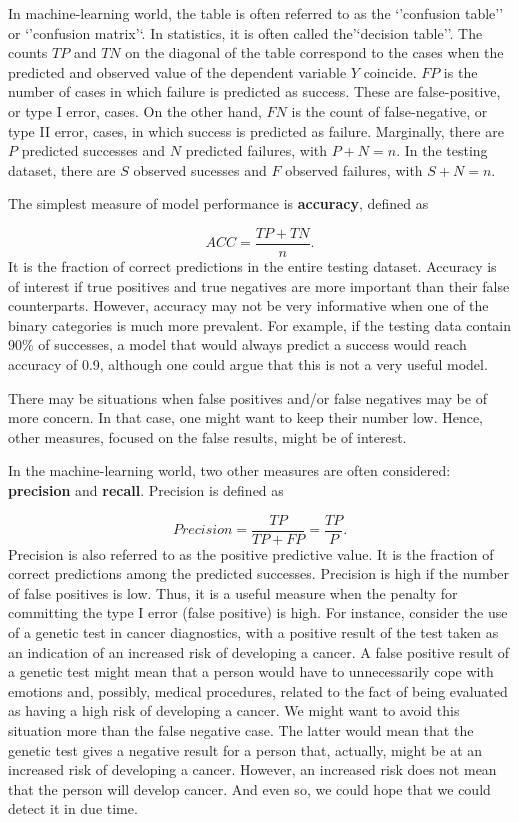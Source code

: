 \documentclass[12pt,]{krantz}
\begin{document}
In machine-learning world, the table is often referred to as the `'confusion table'' or `'confusion matrix'`. In statistics, it is often called the'`decision table''. The counts \(TP\) and \(TN\) on the diagonal of the table correspond to the cases when the predicted and observed value of the dependent variable \(Y\) coincide. \(FP\) is the number of cases in which failure is predicted as success. These are false-positive, or type I error, cases. On the other hand, \(FN\) is the count of false-negative, or type II error, cases, in which success is predicted as failure. Marginally, there are \(P\) predicted successes and \(N\) predicted failures, with \(P+N=n\). In the testing dataset, there are \(S\) observed sucesses and \(F\) observed failures, with \(S+N=n\).

The simplest measure of model performance is \textbf{accuracy}, defined as

\[
ACC = \frac{TP+TN}{n}.
\]
It is the fraction of correct predictions in the entire testing dataset. Accuracy is of interest if true positives and true negatives are more important than their false counterparts. However, accuracy may not be very informative when one of the binary categories is much more prevalent. For example, if the testing data contain 90\% of successes, a model that would always predict a success would reach accuracy of 0.9, although one could argue that this is not a very useful model.

There may be situations when false positives and/or false negatives may be of more concern. In that case, one might want to keep their number low. Hence, other measures, focused on the false results, might be of interest.

In the machine-learning world, two other measures are often considered: \textbf{precision} and \textbf{recall}. Precision is defined as

\[
Precision = \frac{TP}{TP+FP} = \frac{TP}{P}.
\]
Precision is also referred to as the positive predictive value. It is the fraction of correct predictions among the predicted successes. Precision is high if the number of false positives is low. Thus, it is a useful measure when the penalty for committing the type I error (false positive) is high. For instance, consider the use of a genetic test in cancer diagnostics, with a positive result of the test taken as an indication of an increased risk of developing a cancer. A false positive result of a genetic test might mean that a person would have to unnecessarily cope with emotions and, possibly, medical procedures, related to the fact of being evaluated as having a high risk of developing a cancer. We might want to avoid this situation more than the false negative case. The latter would mean that the genetic test gives a negative result for a person that, actually, might be at an increased risk of developing a cancer. However, an increased risk does not mean that the person will develop cancer. And even so, we could hope that we could detect it in due time.
\end{document}
